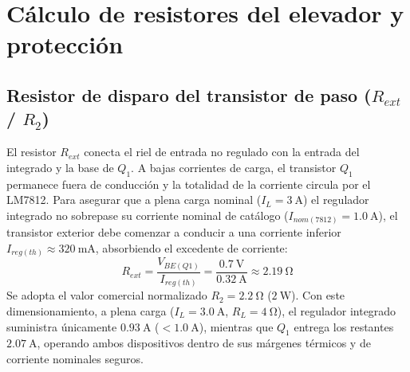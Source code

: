 \section{Cálculo de resistores del elevador y protección}
\label{sec.c5:calculo_resistores}

\subsection{Resistor de disparo del transistor de paso ($R_{ext}$ / $R_2$)}
El resistor $R_{ext}$ conecta el riel de entrada no regulado con la entrada del integrado y la base de $Q_1$. A bajas
corrientes de carga, el transistor $Q_1$ permanece fuera de conducción y la totalidad de la corriente circula por el LM7812.
Para asegurar que a plena carga nominal ($I_L = \SI{3}{\ampere}$) el regulador integrado no sobrepase su corriente nominal
de catálogo ($I_{nom(7812)} = \SI{1.0}{\ampere}$), el transistor exterior debe comenzar a conducir a una corriente inferior
$I_{reg(th)} \approx \SI{320}{\milli\ampere}$, absorbiendo el excedente de corriente:
\begin{equation*}
    R_{ext} = \frac{V_{BE(Q1)}}{I_{reg(th)}} = \frac{\SI{0.7}{\volt}}{\SI{0.32}{\ampere}} \approx \SI{2.19}{\ohm}
\end{equation*}
Se adopta el valor comercial normalizado $R_2 = \SI{2.2}{\ohm}$ ($\SI{2}{\watt}$). Con este dimensionamiento, a plena carga
($I_L = \SI{3.0}{\ampere}$, $R_L = \SI{4}{\ohm}$), el regulador integrado suministra únicamente $\SI{0.93}{\ampere}$
($<\SI{1.0}{\ampere}$), mientras que $Q_1$ entrega los restantes $\SI{2.07}{\ampere}$, operando ambos dispositivos
dentro de sus márgenes térmicos y de corriente nominales seguros.


